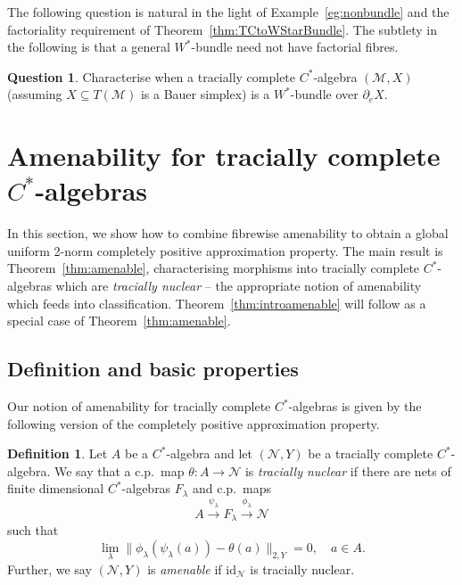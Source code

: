 \documentclass[a4paper,11pt]{amsart}
\theoremstyle{definition}
\newtheorem{definition}[theorem]{Definition}
\newtheorem{question}[theorem]{Question}
\numberwithin{equation}{section}
\numberwithin{theorem}{section}
\begin{document}
The following question is natural in the light of Example~\ref{eg:nonbundle} and the factoriality requirement of Theorem~\ref{thm:TCtoWStarBundle}.
The subtlety in the following is that a general $W^*$-bundle need not have factorial fibres.

\begin{question}
    Characterise when a tracially complete $C^*$-algebra $(\mathcal M,X)$ (assuming $X\subseteq T(\mathcal M)$ is a Bauer simplex) is a $W^*$-bundle over $\partial_eX$.
\end{question}

\section{Amenability for tracially complete \texorpdfstring{$C^*$}{C*}-algebras}\label{sec:amenable}


In this section, we show how to combine fibrewise amenability to obtain a global uniform 2-norm completely positive approximation property. The main result is Theorem~\ref{thm:amenable}, characterising morphisms into tracially complete $C^*$-algebras which are \emph{tracially nuclear} -- the appropriate notion of amenability which feeds into classification. Theorem~\ref{thm:introamenable} will follow as a special case of Theorem~\ref{thm:amenable}.






\subsection{Definition and basic properties}

Our notion of amenability for tracially complete $C^*$-algebras is given by the following version of the completely positive approximation property.

\begin{definition}\label{def:tracially-nuclear}
	Let $A$ be a $C^*$-algebra and let $(\mathcal N, Y)$ be a tracially complete $C^*$-algebra.  We say that a c.p.\ map $\theta \colon A \rightarrow \mathcal N$ is \emph{tracially nuclear} if there are nets of finite dimensional $C^*$-algebras $F_\lambda$ and c.p.\ maps
	\begin{equation}\label{eqn:tracially-nuclear}
		A \overset{\psi_\lambda}{\longrightarrow} F_\lambda \overset{\phi_\lambda}{\longrightarrow} \mathcal N
	\end{equation}
	such that
	\begin{equation}
		\lim_\lambda \| \phi_\lambda(\psi_\lambda(a)) - \theta(a) \|_{2, Y} = 0, \quad a \in A.
	\end{equation}
	Further, we say $(\mathcal N, Y)$ is \emph{{}amenable} if $\mathrm{id}_\mathcal N$ is tracially nuclear.
\end{definition}
\end{document}
